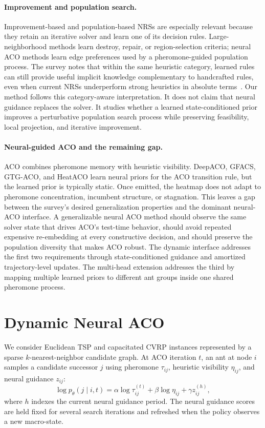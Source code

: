\documentclass[11pt]{article}
\newcommand{\TSP}{\textsc{TSP}}
\newcommand{\CVRP}{\textsc{CVRP}}
\begin{document}
\paragraph{Improvement and population search.}
Improvement-based and population-based NRSs are especially relevant because they retain an iterative solver and learn one of its decision rules.
Large-neighborhood methods learn destroy, repair, or region-selection criteria; neural ACO methods learn edge preferences used by a pheromone-guided population process.
The survey notes that within the same heuristic category, learned rules can still provide useful implicit knowledge complementary to handcrafted rules, even when current NRSs underperform strong heuristics in absolute terms~\cite{nrs-survey}.
Our method follows this category-aware interpretation.
It does not claim that neural guidance replaces the solver.
It studies whether a learned state-conditioned prior improves a perturbative population search process while preserving feasibility, local projection, and iterative improvement.

\paragraph{Neural-guided ACO and the remaining gap.}
ACO combines pheromone memory with heuristic visibility.
DeepACO, GFACS, GTG-ACO, and HeatACO learn neural priors for the ACO transition rule, but the learned prior is typically static.
Once emitted, the heatmap does not adapt to pheromone concentration, incumbent structure, or stagnation.
This leaves a gap between the survey's desired generalization properties and the dominant neural-ACO interface.
A generalizable neural ACO method should observe the same solver state that drives ACO's test-time behavior, should avoid repeated expensive re-embedding at every constructive decision, and should preserve the population diversity that makes ACO robust.
The dynamic interface addresses the first two requirements through state-conditioned guidance and amortized trajectory-level updates.
The multi-head extension addresses the third by mapping multiple learned priors to different ant groups inside one shared pheromone process.

\section{Dynamic Neural ACO}
\label{sec:method}

We consider Euclidean \TSP{} and capacitated \CVRP{} instances represented by a sparse $k$-nearest-neighbor candidate graph.
At ACO iteration $t$, an ant at node $i$ samples a candidate successor $j$ using pheromone $\tau_{ij}$, heuristic visibility $\eta_{ij}$, and neural guidance $z_{ij}$:
\begin{equation}
\log p_\theta(j \mid i,t)
= \alpha \log \tau_{ij}^{(t)}
+ \beta \log \eta_{ij}
+ \gamma z_{ij}^{(h)},
\label{eq:transition}
\end{equation}
where $h$ indexes the current neural guidance period.
The neural guidance scores are held fixed for several search iterations and refreshed when the policy observes a new macro-state.
\end{document}
